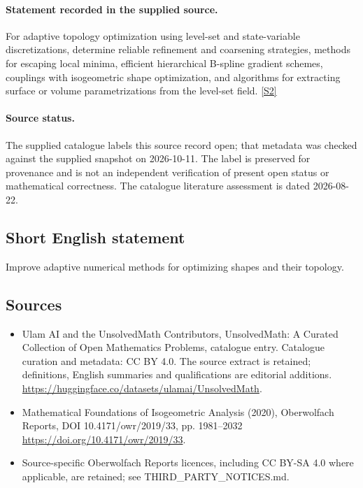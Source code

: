 \documentclass[11pt]{article}
\begin{document}
\paragraph{Statement recorded in the supplied source.}
For adaptive topology optimization using level-set and state-variable discretizations, determine reliable refinement and coarsening strategies, methods for escaping local minima, efficient hierarchical B-spline gradient schemes, couplings with isogeometric shape optimization, and algorithms for extracting surface or volume parametrizations from the level-set field. \href{https://doi.org/10.4171/owr/2019/33}{[S2]}
\paragraph{Source status.}
The supplied catalogue labels this source record open; that metadata was checked against the supplied snapshot on 2026-10-11. The label is preserved for provenance and is not an independent verification of present open status or mathematical correctness. The catalogue literature assessment is dated 2026-08-22.
\subsection{Short English statement}
Improve adaptive numerical methods for optimizing shapes and their topology.
\subsection{Sources}
\begin{itemize}
\item[S1] Ulam AI and the UnsolvedMath Contributors, UnsolvedMath: A Curated Collection of Open Mathematics Problems, catalogue entry. Catalogue curation and metadata: CC BY 4.0. The source extract is retained; definitions, English summaries and qualifications are editorial additions.
\url{https://huggingface.co/datasets/ulamai/UnsolvedMath}.
\item[S2] Mathematical Foundations of Isogeometric Analysis (2020), Oberwolfach Reports, DOI 10.4171/owr/2019/33, pp. 1981--2032
\url{https://doi.org/10.4171/owr/2019/33}.
\item Source-specific Oberwolfach Reports licences, including CC BY-SA 4.0 where applicable, are retained; see THIRD\_PARTY\_NOTICES.md.
\end{itemize}
\end{document}
